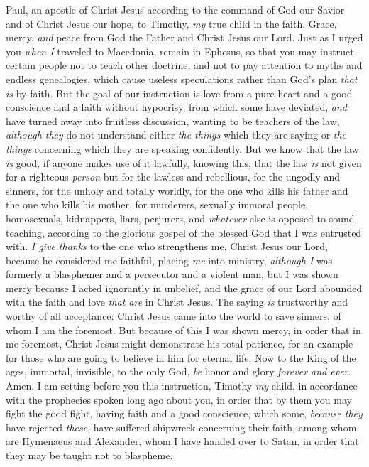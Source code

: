 
\begin{biblechapter} %
 Paul, an apostle of Christ Jesus according to the command of God our Savior and of Christ Jesus our hope,
\verse to Timothy, \textit{my} true child in the faith. Grace, mercy, \textit{and} peace from God the Father and Christ Jesus our Lord.
 Just as I urged you \textit{when I} traveled to Macedonia, remain in Ephesus, so that you may instruct certain people not to teach other doctrine,
\verse and not to pay attention to myths and endless genealogies, which cause useless speculations rather than God’s plan \textit{that is} by faith.
\verse But the goal of our instruction is love from a pure heart and a good conscience and a faith without hypocrisy,
\verse from which some have deviated, \textit{and} have turned away into fruitless discussion,
\verse wanting to be teachers of the law, \textit{although they} do not understand either \textit{the things} which they are saying or \textit{the things} concerning which they are speaking confidently.
\verse But we know that the law \textit{is} good, if anyone makes use of it lawfully,
\verse knowing this, that the law \textit{is} not given for a righteous \textit{person} but for the lawless and rebellious, for the ungodly and sinners, for the unholy and totally worldly, for the one who kills his father and the one who kills his mother, for murderers,
\verse sexually immoral people, homosexuals, kidnappers, liars, perjurers, and \textit{whatever} else is opposed to sound teaching,
\verse according to the glorious gospel of the blessed God that I was entrusted with.
 \textit{I give thanks} to the one who strengthens me, Christ Jesus our Lord, because he considered me faithful, placing \textit{me} into ministry,
\verse \textit{although I} was formerly a blasphemer and a persecutor and a violent man, but I was shown mercy because I acted ignorantly in unbelief,
\verse and the grace of our Lord abounded with the faith and love \textit{that are} in Christ Jesus.
\verse The saying \textit{is} trustworthy and worthy of all acceptance: Christ Jesus came into the world to save sinners, of whom I am the foremost.
\verse But because of this I was shown mercy, in order that in me foremost, Christ Jesus might demonstrate his total patience, for an example for those who are going to believe in him for eternal life.
\verse Now to the King of the ages, immortal, invisible, to the only God, \textit{be} honor and glory \textit{forever and ever}. Amen.
 I am setting before you this instruction, Timothy \textit{my} child, in accordance with the prophecies spoken long ago about you, in order that by them you may fight the good fight,
\verse having faith and a good conscience, which some, \textit{because they} have rejected \textit{these}, have suffered shipwreck concerning their faith,
\verse among whom are Hymenaeus and Alexander, whom I have handed over to Satan, in order that they may be taught not to blaspheme.
\end{biblechapter}

